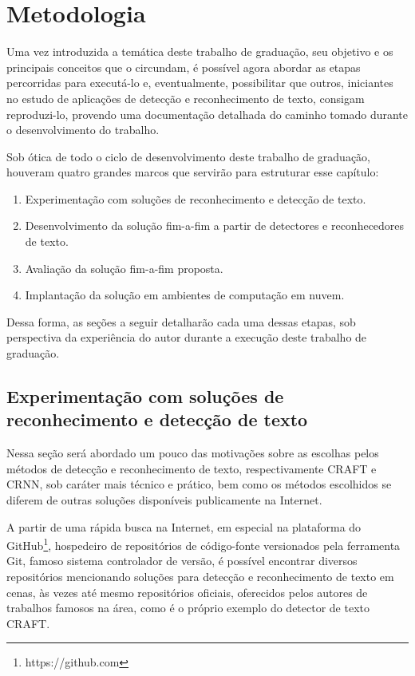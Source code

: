 \chapter{Metodologia}\label{cap:metodologia}

Uma vez introduzida a temática deste trabalho de graduação, seu objetivo e os principais conceitos que o circundam, é possível agora abordar as etapas 
percorridas para executá-lo e, eventualmente, possibilitar que outros, iniciantes no estudo de aplicações de detecção e reconhecimento de texto, 
consigam reproduzi-lo, provendo uma documentação detalhada do caminho tomado durante o desenvolvimento do trabalho.

Sob ótica de todo o ciclo de desenvolvimento deste trabalho de graduação, houveram quatro grandes marcos que servirão para estruturar esse capítulo:

\begin{enumerate}
    \item Experimentação com soluções de reconhecimento e detecção de texto.
    \item Desenvolvimento da solução fim-a-fim a partir de detectores e reconhecedores de texto.
    \item Avaliação da solução fim-a-fim proposta.
    \item Implantação da solução em ambientes de computação em nuvem.
\end{enumerate}

Dessa forma, as seções a seguir detalharão cada uma dessas etapas, sob perspectiva da experiência do autor durante a execução deste 
trabalho de graduação.

\section{Experimentação com soluções de reconhecimento e detecção de texto}\label{sec:metodologia_experimentacao}

Nessa seção será abordado um pouco das motivações sobre as escolhas pelos métodos de detecção e reconhecimento de texto, 
respectivamente CRAFT e CRNN, sob caráter mais técnico e prático, bem como os métodos escolhidos se diferem de outras soluções disponíveis
publicamente na Internet.

A partir de uma rápida busca na Internet, em especial na plataforma do GitHub\footnote{https://github.com}, hospedeiro de repositórios de 
código-fonte versionados pela ferramenta Git, famoso sistema controlador de versão, é possível encontrar diversos repositórios mencionando 
soluções para detecção e reconhecimento de texto em cenas, às vezes até mesmo repositórios oficiais, oferecidos pelos autores de trabalhos 
famosos na área, como é o próprio exemplo do detector de texto CRAFT.

